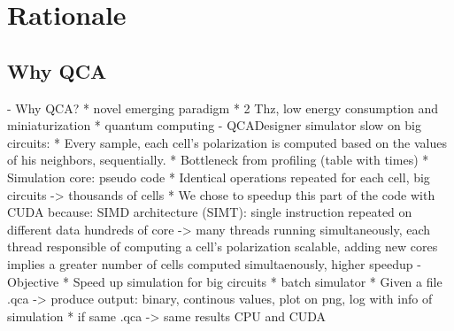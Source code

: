 \chapter{Rationale}\label{sec:rationale}
\section{Why QCA}




- Why QCA?
	* novel emerging paradigm
	* 2 Thz, low energy consumption and miniaturization
	* quantum computing
- QCADesigner simulator slow on big circuits:
	* Every sample, each cell's polarization is computed based on the values of his neighbors, sequentially.
	* Bottleneck from profiling (table with times)
	* Simulation core: pseudo code
	* Identical operations repeated for each cell, big circuits -> thousands of cells
	* We chose to speedup this part of the code with CUDA because:
		 SIMD architecture (SIMT): single instruction repeated on different data
		 hundreds of core -> many threads running simultaneously, each thread responsible of computing a cell's polarization
		 scalable, adding new cores implies a greater number of cells computed simultaenously, higher speedup
- Objective
	* Speed up simulation for big circuits
	* batch simulator
	* Given a file .qca -> produce output: binary, continous values, plot on png, log with info of simulation
	* if same .qca -> same results CPU and CUDA
